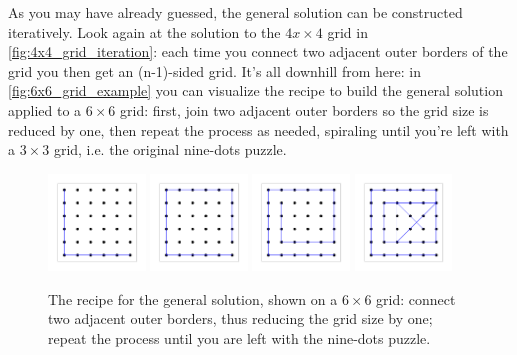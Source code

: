 \documentclass[11pt]{article}
\begin{document}
As you may have already guessed, the general solution can be constructed iteratively. Look again at the solution to the $4x\times 4$ grid in \autoref{fig:4x4_grid_iteration}: each time you connect two adjacent outer borders of the grid you then get an (n-1)-sided grid. It's all downhill from here: in \autoref{fig:6x6_grid_example} you can visualize the recipe to build the general solution applied to a $6\times 6$ grid: first, join two adjacent outer borders so the grid size is reduced by one, then repeat the process as needed, spiraling until you're left with a $3 \times 3$ grid, i.e. the original nine-dots puzzle.
\begin{figure}[H]
\centering
\includegraphics[width=0.23\textwidth]{images/6x6_grid_iteration_01.png}
\includegraphics[width=0.23\textwidth]{images/6x6_grid_iteration_02.png}
\includegraphics[width=0.23\textwidth]{images/6x6_grid_iteration_03.png}
\includegraphics[width=0.23\textwidth]{images/6x6_grid_solution.png}
\caption{The recipe for the general solution, shown on a $6 \times 6$ grid: connect two adjacent outer borders, thus reducing the grid size by one; repeat the process until you are left with the nine-dots puzzle.}
\label{fig:6x6_grid_example}
\end{figure}
\end{document}
